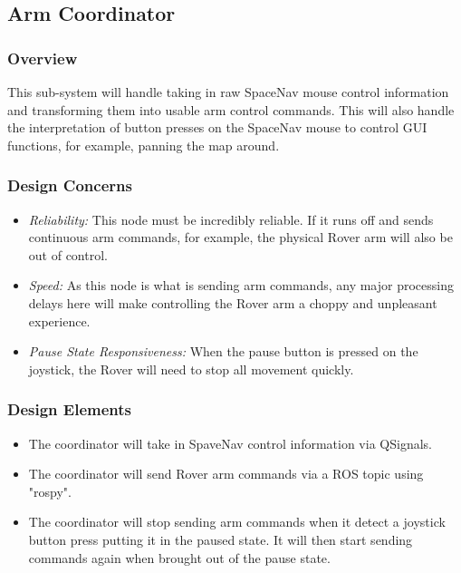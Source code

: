 \subsection{Arm Coordinator}
\subsubsection{Overview}
This sub-system will handle taking in raw SpaceNav mouse control information and transforming them into usable arm control commands.
This will also handle the interpretation of button presses on the SpaceNav mouse to control GUI functions, for example, panning the map around.

\subsubsection{Design Concerns}
\begin{itemize}
\item \textit{Reliability:} This node must be incredibly reliable.
If it runs off and sends continuous arm commands, for example, the physical Rover arm will also be out of control.
\item \textit{Speed:} As this node is what is sending arm commands, any major processing delays here will make controlling the Rover arm a choppy and unpleasant experience.
\item \textit{Pause State Responsiveness:} When the pause button is pressed on the joystick, the Rover will need to stop all movement quickly.
\end{itemize}

\subsubsection{Design Elements}
\begin{itemize}
\item The coordinator will take in SpaveNav control information via QSignals.
\item The coordinator will send Rover arm commands via a ROS topic using "rospy".
\item The coordinator will stop sending arm commands when it detect a joystick button press putting it in the paused state.
It will then start sending commands again when brought out of the pause state.
\end{itemize}

